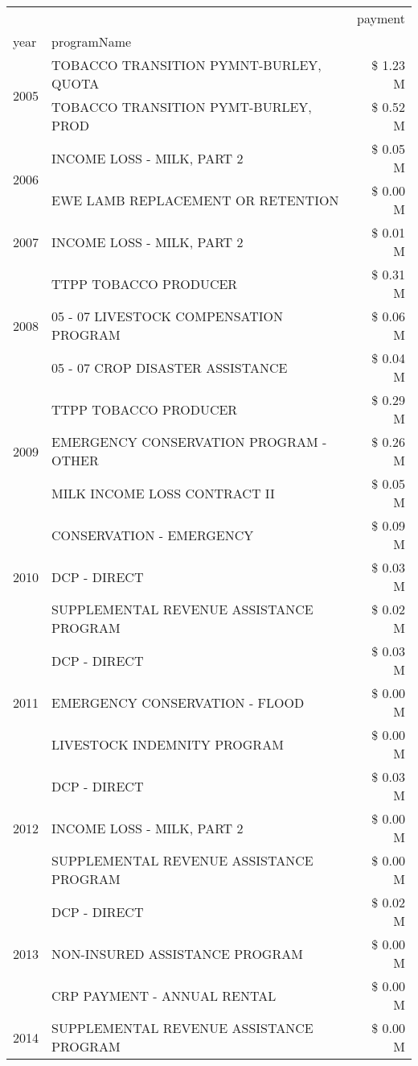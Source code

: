 \begin{tabular}{llr}
\toprule
 &  & payment \\
year & programName &  \\
\midrule
\multirow[t]{2}{*}{2005} & TOBACCO TRANSITION PYMNT-BURLEY, QUOTA & \$ 1.23 M \\
 & TOBACCO TRANSITION PYMT-BURLEY, PROD & \$ 0.52 M \\
\cline{1-3}
\multirow[t]{2}{*}{2006} & INCOME LOSS - MILK, PART 2 & \$ 0.05 M \\
 & EWE LAMB REPLACEMENT OR RETENTION & \$ 0.00 M \\
\cline{1-3}
2007 & INCOME LOSS - MILK, PART 2 & \$ 0.01 M \\
\cline{1-3}
\multirow[t]{3}{*}{2008} & TTPP TOBACCO PRODUCER & \$ 0.31 M \\
 & 05 - 07 LIVESTOCK COMPENSATION PROGRAM & \$ 0.06 M \\
 & 05 - 07 CROP DISASTER ASSISTANCE & \$ 0.04 M \\
\cline{1-3}
\multirow[t]{3}{*}{2009} & TTPP TOBACCO PRODUCER & \$ 0.29 M \\
 & EMERGENCY CONSERVATION PROGRAM - OTHER & \$ 0.26 M \\
 & MILK INCOME LOSS CONTRACT II & \$ 0.05 M \\
\cline{1-3}
\multirow[t]{3}{*}{2010} & CONSERVATION - EMERGENCY & \$ 0.09 M \\
 & DCP - DIRECT & \$ 0.03 M \\
 & SUPPLEMENTAL REVENUE ASSISTANCE PROGRAM & \$ 0.02 M \\
\cline{1-3}
\multirow[t]{3}{*}{2011} & DCP - DIRECT & \$ 0.03 M \\
 & EMERGENCY CONSERVATION - FLOOD & \$ 0.00 M \\
 & LIVESTOCK INDEMNITY PROGRAM & \$ 0.00 M \\
\cline{1-3}
\multirow[t]{3}{*}{2012} & DCP - DIRECT & \$ 0.03 M \\
 & INCOME LOSS - MILK, PART 2 & \$ 0.00 M \\
 & SUPPLEMENTAL REVENUE ASSISTANCE PROGRAM & \$ 0.00 M \\
\cline{1-3}
\multirow[t]{3}{*}{2013} & DCP - DIRECT & \$ 0.02 M \\
 & NON-INSURED ASSISTANCE PROGRAM & \$ 0.00 M \\
 & CRP PAYMENT - ANNUAL RENTAL & \$ 0.00 M \\
\cline{1-3}
\multirow[t]{3}{*}{2014} & SUPPLEMENTAL REVENUE ASSISTANCE PROGRAM & \$ 0.00 M \\

\end{tabular}
